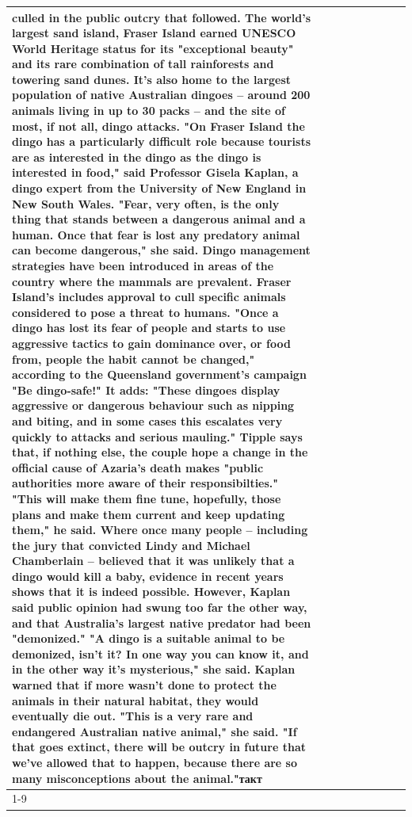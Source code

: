 \begin{table}[H]
\begin{tabular}{lllrlllll}
culled in the public outcry that followed. The world's largest sand island, Fraser Island earned UNESCO World Heritage status for its "exceptional beauty" and its rare combination of tall rainforests and towering sand dunes. It's also home to the largest population of native Australian dingoes -- around 200 animals living in up to 30 packs -- and the site of most, if not all, dingo attacks. "On Fraser Island the dingo has a particularly difficult role because tourists are as interested in the dingo as the dingo is interested in food," said Professor Gisela Kaplan, a dingo expert from the University of New England in New South Wales. "Fear, very often, is the only thing that stands between a dangerous animal and a human. Once that fear is lost any predatory animal can become dangerous," she said. Dingo management strategies have been introduced in areas of the country where the mammals are prevalent. Fraser Island's includes approval to cull specific animals considered to pose a threat to humans. "Once a dingo has lost its fear of people and starts to use aggressive tactics to gain dominance over, or food from, people the habit cannot be changed," according to the Queensland government's campaign "Be dingo-safe!" It adds: "These dingoes display aggressive or dangerous behaviour such as nipping and biting, and in some cases this escalates very quickly to attacks and serious mauling." Tipple says that, if nothing else, the couple hope a change in the official cause of Azaria's death makes "public authorities more aware of their responsibilties." "This will make them fine tune, hopefully, those plans and make them current and keep updating them," he said. Where once many people -- including the jury that convicted Lindy and Michael Chamberlain -- believed that it was unlikely that a dingo would kill a baby, evidence in recent years shows that it is indeed possible. However, Kaplan said public opinion had swung too far the other way, and that Australia's largest native predator had been "demonized." "A dingo is a suitable animal to be demonized, isn't it? In one way you can know it, and in the other way it's mysterious," she said. Kaplan warned that if more wasn't done to protect the animals in their natural habitat, they would eventually die out. "This is a very rare and endangered Australian native animal," she said. "If that goes extinct, there will be outcry in future that we've allowed that to happen, because there are so many misconceptions about the animal."такт \\
\cline{1-9}

\end{tabular}
\end{table}
